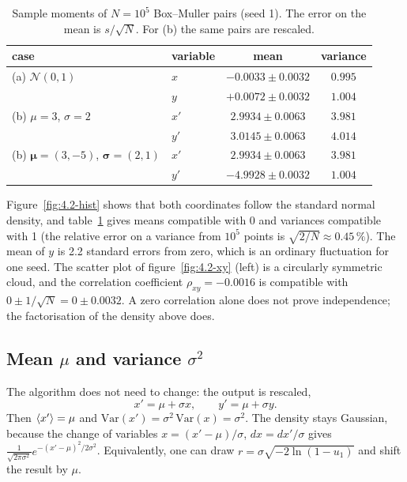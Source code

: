 \begin{table}[htbp]
  \centering
  \caption{Sample moments of $N = 10^5$ Box--Muller pairs (seed 1). The error on the mean is
    $s/\sqrt N$. For (b) the same pairs are rescaled.}
  \label{tab:4.2-moments}
  \begin{tabular}{llcc}
    \toprule
    case & variable & mean & variance \\
    \midrule
    (a) $\mathcal N(0,1)$             & $x$  & $-0.0033 \pm 0.0032$ & $0.995$ \\
                                      & $y$  & $+0.0072 \pm 0.0032$ & $1.004$ \\
    (b) $\mu = 3$, $\sigma = 2$       & $x'$ & $2.9934 \pm 0.0063$  & $3.981$ \\
                                      & $y'$ & $3.0145 \pm 0.0063$  & $4.014$ \\
    (b) $\boldsymbol\mu = (3,-5)$, $\boldsymbol\sigma = (2,1)$
                                      & $x'$ & $2.9934 \pm 0.0063$  & $3.981$ \\
                                      & $y'$ & $-4.9928 \pm 0.0032$ & $1.004$ \\
    \bottomrule
  \end{tabular}
\end{table}

Figure~\ref{fig:4.2-hist} shows that both coordinates follow the standard normal density, and
table~\ref{tab:4.2-moments} gives means compatible with 0 and variances compatible with 1 (the
relative error on a variance from $10^5$ points is $\sqrt{2/N} \approx 0.45\,\%$). The mean of $y$ is
2.2 standard errors from zero, which is an ordinary fluctuation for one seed. The scatter plot of
figure~\ref{fig:4.2-xy} (left) is a circularly symmetric cloud, and the correlation coefficient
$\rho_{xy} = -0.0016$ is compatible with $0 \pm 1/\sqrt N = 0 \pm 0.0032$. A zero correlation alone
does not prove independence; the factorisation of the density above does.

\subsection{Mean $\mu$ and variance $\sigma^2$}

The algorithm does not need to change: the output is rescaled,
\begin{equation}
  x' = \mu + \sigma x, \qquad y' = \mu + \sigma y .
\end{equation}
Then $\left\langle x' \right\rangle = \mu$ and $\mathrm{Var}(x') = \sigma^2\,\mathrm{Var}(x) = \sigma^2$. The density stays
Gaussian, because the change of variables $x = (x'-\mu)/\sigma$, $dx = dx'/\sigma$ gives
$\frac{1}{\sqrt{2\pi\sigma^2}} e^{-(x'-\mu)^2/2\sigma^2}$. Equivalently, one can draw
$r = \sigma\sqrt{-2\ln(1-u_1)}$ and shift the result by $\mu$.

